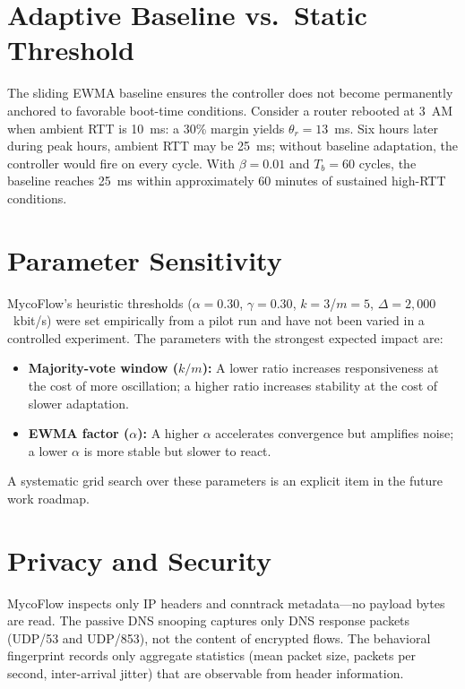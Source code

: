 \section{Adaptive Baseline vs.\ Static Threshold}

The sliding EWMA baseline ensures the controller does not become permanently anchored to favorable boot-time conditions. Consider a router rebooted at 3~AM when ambient RTT is 10~ms: a 30\% margin yields $\theta_r = 13$~ms. Six hours later during peak hours, ambient RTT may be 25~ms; without baseline adaptation, the controller would fire on every cycle. With $\beta = 0.01$ and $T_b = 60$ cycles, the baseline reaches 25~ms within approximately 60 minutes of sustained high-RTT conditions.

\section{Parameter Sensitivity}

MycoFlow's heuristic thresholds ($\alpha=0.30$, $\gamma=0.30$, $k=3$/$m=5$, $\Delta=2{,}000$~kbit/s) were set empirically from a pilot run and have not been varied in a controlled experiment. The parameters with the strongest expected impact are:

\begin{itemize}
  \item \textbf{Majority-vote window ($k/m$):} A lower ratio increases responsiveness at the cost of more oscillation; a higher ratio increases stability at the cost of slower adaptation.
  \item \textbf{EWMA factor ($\alpha$):} A higher $\alpha$ accelerates convergence but amplifies noise; a lower $\alpha$ is more stable but slower to react.
\end{itemize}

A systematic grid search over these parameters is an explicit item in the future work roadmap.

\section{Privacy and Security}

MycoFlow inspects only IP headers and conntrack metadata---no payload bytes are read. The passive DNS snooping captures only DNS response packets (UDP/53 and UDP/853), not the content of encrypted flows. The behavioral fingerprint records only aggregate statistics (mean packet size, packets per second, inter-arrival jitter) that are observable from header information.

